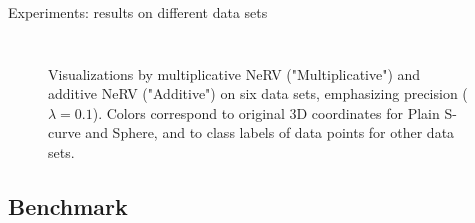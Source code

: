 \documentclass[first=dgreen,second=purple,logo=yellowexc]{aaltoslides}
\begin{document}
\begin{frame}{Experiments: results on different data sets}
\begin{figure}[!htb]
\begin{columns}
\begin{column}{0.6\textwidth}
\begin{tabular}{cc}
\end{tabular}
\end{column}
\begin{column}{0.35\textwidth}
\caption{\footnotesize{Visualizations by multiplicative NeRV ("Multiplicative") and additive
  NeRV ("Additive") on six data sets, emphasizing precision
  ($\lambda=0.1$). Colors correspond to original 3D coordinates for Plain S-curve and Sphere, 
    and to class labels of data points for other data sets.}}
\end{column}
\end{columns}
\label{fig:compared_with_original3}
\end{figure}
\end{frame}

\subsection{Benchmark}
\end{document}
